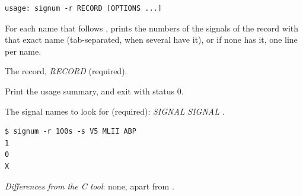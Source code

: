 \begin{lstlisting}[style=signature,language={}]
usage: signum -r RECORD [OPTIONS ...]
\end{lstlisting}
For each name that follows , prints the numbers of the signals of the record with
that exact name (tab-separated, when several have it), or  if none has it, one line
per name.
\begin{params}
\item[-r] The record, \textit{RECORD} (required).
\item[-h] Print the usage summary, and exit with status 0.
\item[-s] The signal names to look for (required):
   \textit{SIGNAL} \code{[}\textit{SIGNAL} \code{...]}.
\end{params}
\begin{lstlisting}[style=text]
$ signum -r 100s -s V5 MLII ABP
1
0
X
\end{lstlisting}
\textit{Differences from the C tool}: none, apart from .

